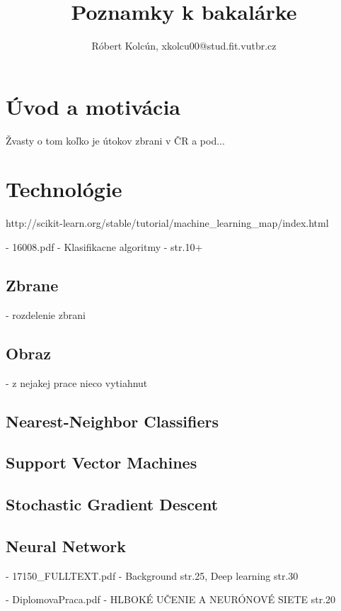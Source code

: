\documentclass[10pt,a4paper]{article}
\begin{document}
\title{Poznamky k bakalárke}
\author{Róbert Kolcún, xkolcu00@stud.fit.vutbr.cz}
\maketitle


\section{Úvod a motivácia}
Žvasty o tom koľko je útokov zbrani v ČR a pod...


\section{Technológie}

http://scikit-learn.org/stable/tutorial/machine\_learning\_map/index.html

- 16008.pdf - Klasifikacne algoritmy - str.10+

\subsection{Zbrane}
- rozdelenie zbrani

\subsection{Obraz}
- z nejakej prace nieco vytiahnut

\subsection{Nearest-Neighbor Classifiers}

\subsection{Support Vector Machines}

\subsection{Stochastic Gradient Descent}

\subsection{Neural Network}
- 17150\_FULLTEXT.pdf - Background str.25, Deep learning str.30

- DiplomovaPraca.pdf - HLBOKÉ UČENIE A NEURÓNOVÉ SIETE str.20
\end{document}
